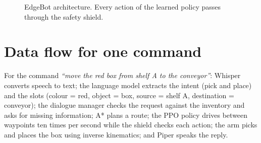 \documentclass[12pt,a4paper,oneside]{report}
\begin{document}
\begin{figure}[H]
\centering
{}
\caption{EdgeBot architecture. Every action of the learned policy passes through the safety shield.}
\label{fig:arch}
\end{figure}

\section{Data flow for one command}
For the command \emph{``move the red box from shelf A to the conveyor''}: Whisper converts speech to text; the
language model extracts the intent (pick and place) and the slots (colour = red, object = box, source = shelf A,
destination = conveyor); the dialogue manager checks the request against the inventory and asks for missing
information; A* plans a route; the PPO policy drives between waypoints ten times per second while the shield checks
each action; the arm picks and places the box using inverse kinematics; and Piper speaks the reply.
\end{document}
